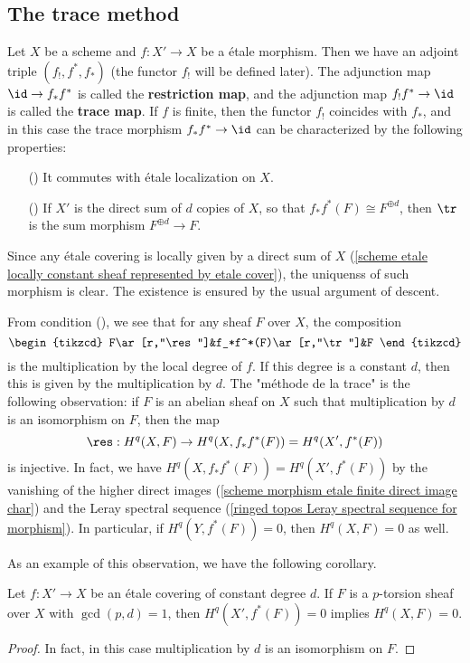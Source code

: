 \subsection{The trace method}
Let $X$ be a scheme and $f:X'\to X$ be a \'etale morphism. Then we have an adjoint triple $(f_!,f^*,f_*)$ (the functor $f_!$ will be defined later). The adjunction map $\id\to f_*f^*$ is called the \textbf{restriction map}, and the adjunction map $f_!f^*\to\id$ is called the \textbf{trace map}. If $f$ is finite, then the functor $f_!$ coincides with $f_*$, and in this case the trace morphism $f_*f^*\to\id$ can be characterized by the following properties:
\begin{enumerate}
    \item[(\rmnum{1})] It commutes with \'etale localization on $X$.
    \item[(\rmnum{2})] If $X'$ is the direct sum of $d$ copies of $X$, so that $f_*f^*(F)\cong F^{\oplus d}$, then $\tr$ is the sum morphism $F^{\oplus d}\to F$.
\end{enumerate}
Since any \'etale covering is locally given by a direct sum of $X$ (\cref{scheme etale locally constant sheaf represented by etale cover}), the uniquenss of such morphism is clear. The existence is ensured by the usual argument of descent.\par
From condition (), we see that for any sheaf $F$ over $X$, the composition
\[\begin{tikzcd}
F\ar[r,"\res"]&f_*f^*(F)\ar[r,"\tr"]&F
\end{tikzcd}\]
is the multiplication by the local degree of $f$. If this degree is a constant $d$, then this is given by the multiplication by $d$. The "m\'ethode de la trace" is the following observation: if $F$ is an abelian sheaf on $X$ such that multiplication by $d$ is an isomorphism on $F$, then the map
\[\res:H^q(X,F)\to H^q(X,f_*f^*(F))=H^q(X',f^*(F))\]
is injective. In fact, we have $H^q(X,f_*f^*(F))=H^q(X',f^*(F))$ by the vanishing of the higher direct images (\cref{scheme morphism etale finite direct image char}) and the Leray spectral sequence (\cref{ringed topos Leray spectral sequence for morphism}). In particular, if $H^q(Y,f^*(F))=0$, then $H^q(X,F)=0$ as well.\par
As an example of this observation, we have the following corollary.
\begin{corollary}\label{scheme p-torsion etale sheaf trace method}
Let $f:X'\to X$ be an \'etale covering of constant degree $d$. If $F$ is a $p$-torsion sheaf over $X$ with $\gcd(p,d)=1$, then $H^q(X',f^*(F))=0$ implies $H^q(X,F)=0$.
\end{corollary}
\begin{proof}
In fact, in this case multiplication by $d$ is an isomorphism on $F$.
\end{proof}

